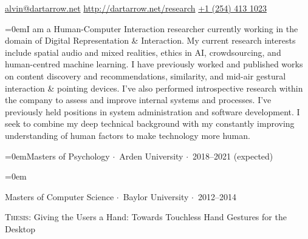 \documentclass[a4paper]{scrartcl}
\newcommand{\Description}[1]{\hangindent=0em\hangafter=0\noindent\small{#1}\par\normalsize\vspace{1em}} %
\newcommand{\Redvline}[0]{\vspace{0em}\noindent{\color{ThemeColor}\rule{18cm}{0.4pt}}\vspace{-0.5em}}
\newcommand{\MyName}[1]{\noindent{\textsc{\LARGE{\color{ThemeColor}#1}}}} %
\newcommand{\BlockTitle}[1]{\textsc{\vspace{0.15em}}\noindent{\spacedlowsmallcaps{#1}}\vspace{1em}}
\begin{document}
\thispagestyle{empty} %





\MyName{Alvin Jude} %

\href{mailto:alvin@dartarrow.net}{alvin@dartarrow.net} %
\hspace*{\fill}
\href{http://dartarrow.net/research}{http://dartarrow.net/research} %
\hspace*{\fill}
\href{tel:+1 (254) 413 1023}{+1 (254) 413 1023}

\Redvline
\vspace{1em} %


\Description{I am a Human-Computer Interaction researcher currently working in the domain of Digital Representation \& Interaction. My current research interests include spatial audio and mixed realities, ethics in AI, crowdsourcing, and human-centred machine learning.
I have previously worked and published works on content discovery and recommendations, similarity, and mid-air gestural interaction \& pointing devices. I've also performed introspective research within the company to assess and improve internal systems and processes.
I've previously held positions in system administration and software development. I seek to combine my deep technical background with my constantly improving understanding of human factors to make technology more human.
}

\Redvline

\BlockTitle{Education}

\Description{Masters of Psychology $\cdotp$\ Arden University $\cdotp$\ 2018--2021 (expected)}

\Description{Masters of Computer Science $\cdotp$\ Baylor University $\cdotp$\ 2012--2014

\textsc{Thesis:} Giving the Users a Hand: Towards Touchless Hand Gestures for the Desktop
}
\end{document}
